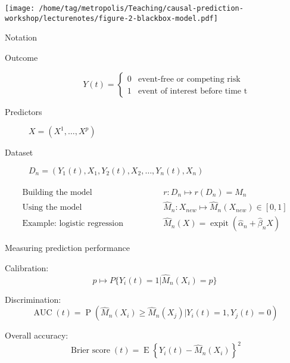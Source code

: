 \documentclass{beamer}\usepackage{listings}
\begin{document}
\begin{frame}[label={sec:org970b1b7}]{}
\begin{center}
\texttt{[image: /home/tag/metropolis/Teaching/causal-prediction-workshop/lecturenotes/figure-2-blackbox-model.pdf]}
\end{center}
\end{frame}
\begin{frame}[label={sec:orga9ca393}]{Notation}
\begin{description}
\item[{Outcome}] $$Y(t)= \begin{cases}
      0 & \text{event-free or competing risk}\\
      1 & \text{event of interest before time t}
    \end{cases}$$
\item[{Predictors}] \qquad\(X = (X^{1},\dots,X^{p})\)
\item[{Dataset}] \qquad \(D_n=(Y_1(t),X_1, Y_2(t),X_2, \dots, Y_n(t),X_n)\)
\end{description}

\begin{align*}
\text{Building the model}&\qquad\qquad\ensuremath{r}: \ensuremath{D}_n\mapsto \ensuremath{r}(\ensuremath{D}_n)=\hat M_n\\[2em]
\text{Using the model}&\qquad\qquad \hat M_n : X_{new}\mapsto \hat M_n(X_{new})\in [0,1]\\[2em]
\text{Example: logistic regression} & \qquad\qquad \hat M_n(X) = \operatorname{expit}(\hat\alpha_n + \hat\beta_n X)
\end{align*}
\end{frame}
\begin{frame}[label={sec:orge8607f2}]{Measuring prediction performance}
\begin{block}{Calibration:}
\begin{equation*}
p\mapsto P\{Y_i(t)=1| \hat M_n(X_i)=p\}
\end{equation*}
\end{block}
\begin{block}{Discrimination:}
\begin{equation*}
  \operatorname{AUC}(t) = \operatorname{P}(\hat M_n(X_i)\ge \hat M_n(X_j)|Y_i(t)=1,Y_j(t)=0)
\end{equation*}
\end{block}
\begin{block}{Overall accuracy:}
\begin{equation*}
  \operatorname{Brier\ score}(t) = \operatorname{E}\left\{Y_i(t)-\hat M_n(X_i)\right\}^2
\end{equation*}
\end{block}
\end{frame}
\end{document}
